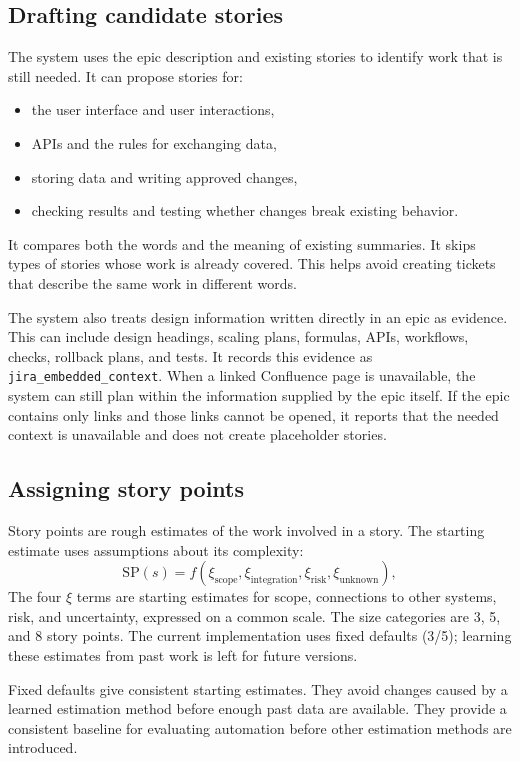 \documentclass[10pt,a4paper]{article}
\begin{document}
\subsection{Drafting candidate stories}
The system uses the epic description and existing stories to identify work that is still needed. It can propose stories for:
\begin{itemize}
  \item the user interface and user interactions,
  \item APIs and the rules for exchanging data,
  \item storing data and writing approved changes,
  \item checking results and testing whether changes break existing behavior.
\end{itemize}

It compares both the words and the meaning of existing summaries. It skips types of stories whose work is already covered. This helps avoid creating tickets that describe the same work in different words.

The system also treats design information written directly in an epic as evidence. This can include design headings, scaling plans, formulas, APIs, workflows, checks, rollback plans, and tests. It records this evidence as \texttt{jira\_embedded\_context}. When a linked Confluence page is unavailable, the system can still plan within the information supplied by the epic itself. If the epic contains only links and those links cannot be opened, it reports that the needed context is unavailable and does not create placeholder stories.

\subsection{Assigning story points}
Story points are rough estimates of the work involved in a story. The starting estimate uses assumptions about its complexity:
\begin{equation}
\mathrm{SP}(s) = f(\xi_{\text{scope}}, \xi_{\text{integration}}, \xi_{\text{risk}}, \xi_{\text{unknown}}),
\end{equation}
The four $\xi$ terms are starting estimates for scope, connections to other systems, risk, and uncertainty, expressed on a common scale. The size categories are 3, 5, and 8 story points. The current implementation uses fixed defaults (3/5); learning these estimates from past work is left for future versions.

Fixed defaults give consistent starting estimates. They avoid changes caused by a learned estimation method before enough past data are available. They provide a consistent baseline for evaluating automation before other estimation methods are introduced.
\end{document}
